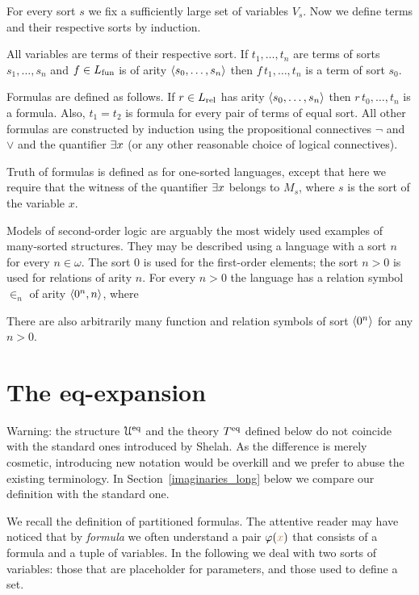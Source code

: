\documentclass[creche.tex]{subfiles}
\begin{document}
For every sort $s$ we fix a sufficiently large set of variables $V_s$. Now we define terms and their respective sorts by induction.

All variables are terms of their respective sort. If $t_1,\dots,t_n$ are terms of sorts $s_1,\dots,s_n$ and $f\in L_{\rm fun}$ is of arity $\langle s_0,\dots,s_n\rangle$ then $f\,t_1,\dots,t_n$ is a term of sort $s_0$. 

Formulas are defined as follows. If $r\in L_{\rm rel}$ has arity $\langle s_0,\dots,s_n\rangle$ then $r\,t_0,\dots,t_n$ is a formula. Also, $t_1=t_2$ is formula for every pair of terms of equal sort. All other formulas are constructed by induction using the propositional connectives $\neg$ and $\vee$ and the quantifier $\exists x$ (or any other reasonable choice of logical connectives).

Truth of formulas is defined as for one-sorted languages, except that here we require that the witness of the quantifier $\exists x$ belongs to $M_s$, where $s$ is the sort of the variable $x$.

Models of second-order logic are arguably the most widely used examples of many-sorted structures. They may be described using a language with a sort $n$ for every $n\in\omega$. The sort $0$ is used for the first-order elements; the sort $n>0$ is used for relations of arity $n$. For every $n>0$ the language has a relation symbol $\in_n$ of arity $\langle0^n,n\rangle$, where 


There are also arbitrarily many function and relation symbols of sort $\langle0^n\rangle$ for any $n>0$.

\section{The eq-expansion}\label{immaginari}

\noindent\llap{\textcolor{red}{\Large\danger}\kern1.5ex}Warning: the structure $\EuScript U^{{\rm eq}}$ and the theory $T^{{\rm eq}}$ defined below do not coincide with the standard ones introduced by Shelah. As the difference is merely cosmetic, introducing new notation would be overkill and we prefer to abuse the existing terminology. In Section~\ref{imaginaries_long} below we compare our definition with the standard one. %

We recall the definition of partitioned formulas. The attentive reader may have noticed that by \textit{formula\/} we often understand a pair $\varphi({\color{brown} x})$ that consists of a formula and a tuple of variables.
In the following we deal with two sorts of variables: those that are placeholder for parameters, and those used to define a set.
\end{document}
